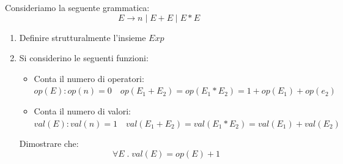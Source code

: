\documentclass[a4paper]{article}
\begin{document}
\begin{exercise}
  Consideriamo la seguente grammatica:
  \[
    E \to n \mid E + E \mid E * E
  \] 
  \begin{enumerate}
    \item Definire strutturalmente l'insieme \( Exp \)

    \item Si considerino le seguenti funzioni:
      \begin{itemize}
        \item Conta il numero di operatori:\\
          \( op(E): op(n) = 0 \quad op(E_1 + E_2) = op(E_1 * E_2) = 1 + op(E_1) +
          op(e_2) \)

        \item Conta il numero di valori:\\
          \( val(E): val(n) = 1 \quad val(E_1 + E_2) = val(E_1 * E_2) = val(E_1) + val(E_2) \)
      \end{itemize}
      Dimostrare che:
      \[
        \forall E \;.\; val(E) = op(E) + 1
      \] 
  \end{enumerate}


\end{exercise}
\end{document}

